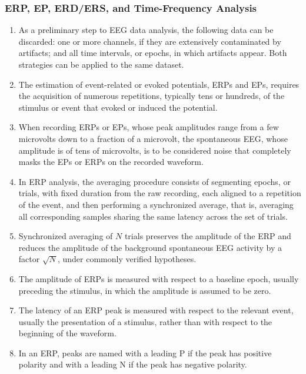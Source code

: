 \subsubsection{ERP, EP, ERD/ERS, and Time-Frequency Analysis}

\begin{enumerate}[label=\arabic*.]
    \item As a preliminary step to EEG data analysis, the following data can be discarded: one or more channels, if they are extensively contaminated by artifacts; and all time intervals, or epochs, in which artifacts appear. Both strategies can be applied to the same dataset.
    
    \item The estimation of event-related or evoked potentials, ERPs and EPs, requires the acquisition of numerous repetitions, typically tens or hundreds, of the stimulus or event that evoked or induced the potential.
    
    \item When recording ERPs or EPs, whose peak amplitudes range from a few microvolts down to a fraction of a microvolt, the spontaneous EEG, whose amplitude is of tens of microvolts, is to be considered noise that completely masks the EPs or ERPs on the recorded waveform.
    
    \item In ERP analysis, the averaging procedure consists of segmenting epochs, or trials, with fixed duration from the raw recording, each aligned to a repetition of the event, and then performing a synchronized average, that is, averaging all corresponding samples sharing the same latency across the set of trials.
    
    \item Synchronized averaging of $N$ trials preserves the amplitude of the ERP and reduces the amplitude of the background spontaneous EEG activity by a factor $\sqrt{N}$, under commonly verified hypotheses.
    
    \item The amplitude of ERPs is measured with respect to a baseline epoch, usually preceding the stimulus, in which the amplitude is assumed to be zero.
    
    \item The latency of an ERP peak is measured with respect to the relevant event, usually the presentation of a stimulus, rather than with respect to the beginning of the waveform.
    
    \item In an ERP, peaks are named with a leading P if the peak has positive polarity and with a leading N if the peak has negative polarity.
    

\end{enumerate}
